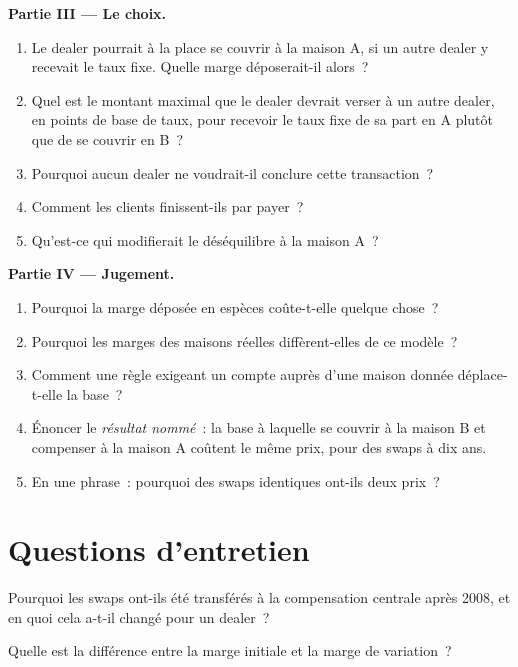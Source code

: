 \begin{problem}
\medskip\noindent\textbf{Partie III --- Le choix.}
\begin{enumerate}[resume]
\item Le dealer pourrait à la place se couvrir à la maison A, si un autre dealer y recevait
le taux fixe. Quelle marge déposerait-il alors~?
\item Quel est le montant maximal que le dealer devrait verser à un autre dealer, en points de base
de taux, pour recevoir le taux fixe de sa part en A plutôt que de se couvrir en B~?
\item Pourquoi aucun dealer ne voudrait-il conclure cette transaction~?
\item Comment les clients finissent-ils par payer~?
\item Qu'est-ce qui modifierait le déséquilibre à la maison A~?
\end{enumerate}

\medskip\noindent\textbf{Partie IV --- Jugement.}
\begin{enumerate}[resume]
\item Pourquoi la marge déposée en espèces coûte-t-elle quelque chose~?
\item Pourquoi les marges des maisons réelles diffèrent-elles de ce modèle~?
\item Comment une règle exigeant un compte auprès d'une maison donnée déplace-t-elle la base~?
\item Énoncer le \emph{résultat nommé}~: la base à laquelle se couvrir à la maison B et compenser
à la maison A coûtent le même prix, pour des swaps à dix ans.
\item En une phrase~: pourquoi des swaps identiques ont-ils deux prix~?
\end{enumerate}
\end{problem}

\section{Questions d'entretien}

\begin{interviewq}\label{iq:m2:swap-clearing-and-the-ccp-basis:1}
Pourquoi les swaps ont-ils été transférés à la compensation centrale après 2008, et en quoi
cela a-t-il changé pour un dealer~?
\end{interviewq}

\begin{interviewq}\label{iq:m2:swap-clearing-and-the-ccp-basis:2}
Quelle est la différence entre la marge initiale et la marge de variation~?
\end{interviewq}

